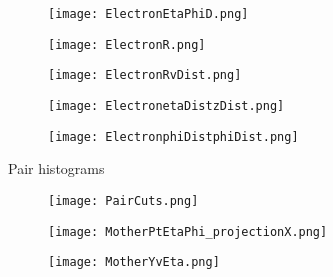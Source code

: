 \documentclass{beamer}
\begin{document}
\begin{frame}
  \begin{figure}[h!]
  \centering
  \texttt{[image: ElectronEtaPhiD.png]}
  \end{figure}
\end{frame}

\begin{frame}
  \begin{figure}[h!]
  \centering
  \texttt{[image: ElectronR.png]}
  \end{figure}
\end{frame}

\begin{frame}
  \begin{figure}[h!]
  \centering
  \texttt{[image: ElectronRvDist.png]}
  \end{figure}
\end{frame}

\begin{frame}
  \begin{figure}[h!]
  \centering
  \texttt{[image: ElectronetaDistzDist.png]}
  \end{figure}
\end{frame}

\begin{frame}
  \begin{figure}[h!]
  \centering
  \texttt{[image: ElectronphiDistphiDist.png]}
  \end{figure}
\end{frame}

\begin{frame}
  \begin{center}
 	\Huge Pair histograms
 	\end{center}
\end{frame}

\begin{frame}
  \begin{figure}[h!]
  \centering
  \texttt{[image: PairCuts.png]}
  \end{figure}
\end{frame}

\begin{frame}
  \begin{figure}[h!]
  \centering
  \texttt{[image: MotherPtEtaPhi\_projectionX.png]}
  \end{figure}
\end{frame}

\begin{frame}
  \begin{figure}[h!]
  \centering
  \texttt{[image: MotherYvEta.png]}
  \end{figure}
\end{frame}
\end{document}
